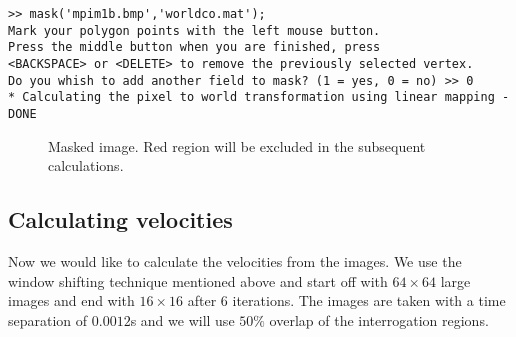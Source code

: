 \documentclass{book}
\begin{document}
\begin{verbatim}
>> mask('mpim1b.bmp','worldco.mat');
Mark your polygon points with the left mouse button.
Press the middle button when you are finished, press
<BACKSPACE> or <DELETE> to remove the previously selected vertex.
Do you whish to add another field to mask? (1 = yes, 0 = no) >> 0
* Calculating the pixel to world transformation using linear mapping - DONE
\end{verbatim}
\begin{figure}
\caption[\ ]{\label{fig:maskim} Masked image. Red region will be
excluded in the subsequent calculations.}
\end{figure}

\subsection{Calculating velocities}
Now we would like to calculate the velocities from the images. We use
the window shifting technique mentioned above and start off with
$64\times64$ large images and end with $16\times16$ after 6 iterations.
The images are taken with a time separation of $0.0012$s and we will use
$50\%$ overlap of the interrogation regions.
\end{document}
